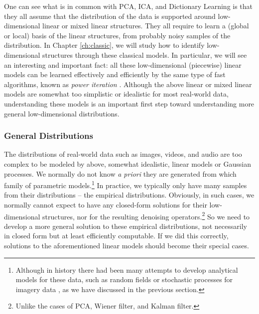 \documentclass[\toplevelprefix/book-main.tex]{subfiles}
\begin{document}
One can see what is in common with PCA, ICA, and Dictionary Learning is that they all assume that the distribution of the data is supported around low-dimensional linear or mixed linear structures. They all require to learn a (global or local) basis of the linear structures, from probably noisy samples of the distribution. In Chapter \ref{ch:classic}, we will study how to identify low-dimensional structures through these classical models. In particular, we will see an interesting and important fact: all these low-dimensional (piecewise) linear models can be learned effectively and efficiently by the same type of fast algorithms, known as {\em power iteration} \cite{Zhai-2020}. Although the above linear or mixed linear models are somewhat too simplistic or idealistic for most real-world data, understanding these models is an important first step toward understanding more general low-dimensional distributions. 

\subsubsection{General Distributions}\label{sec:denoising-intro}

The distributions of real-world data such as images, videos, and audio are too complex to be modeled by above, somewhat idealistic, linear models or Gaussian processes. We normally do not know {\em a priori} they are generated from which family of parametric models.\footnote{Although in history there had been many attempts to develop analytical models for these data, such as random fields or stochastic processes for imagery data \cite{Mumford-1999}, as we have discussed in the previous section.} In practice, we typically only have many samples from their distributions -- the empirical distributions. Obviously, in such cases, we normally cannot expect to have any closed-form solutions for their low-dimensional structures, nor for the resulting denoising operators.\footnote{Unlike the cases of PCA, Wiener filter, and Kalman filter.} So we need to develop a more general solution to these empirical distributions, not necessarily in closed form but at least efficiently computable. If we did this correctly, solutions to the aforementioned linear models should become their special cases. 
\end{document}

